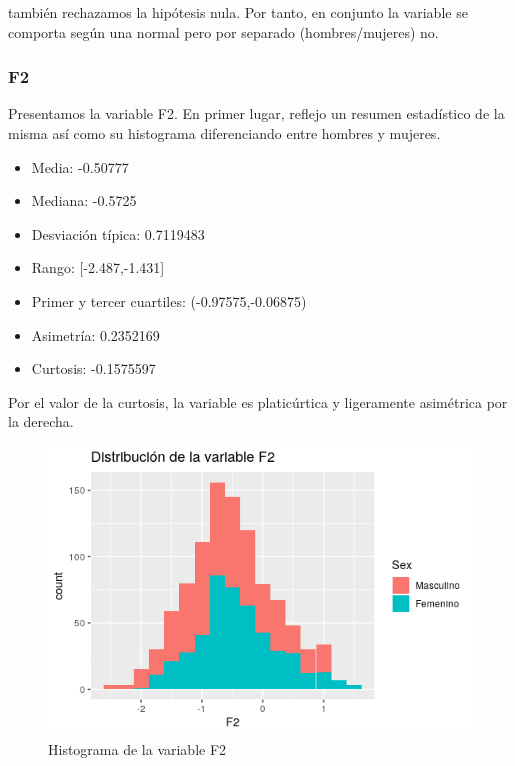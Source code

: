 también rechazamos la hipótesis nula. Por tanto, en conjunto la variable se comporta según una normal pero por separado (hombres/mujeres) no.

\subsubsection{F2}

Presentamos la variable F2. En primer lugar, reflejo un resumen estadístico de la misma así como su histograma diferenciando entre hombres y mujeres.
\begin{itemize}
	\item Media: -0.50777
	\item Mediana: -0.5725
	\item Desviación típica: 0.7119483
	\item Rango: [-2.487,-1.431]
	\item Primer y tercer cuartiles: (-0.97575,-0.06875)
	\item Asimetría: 0.2352169
	\item Curtosis: -0.1575597
\end{itemize}

Por el valor de la curtosis, la variable es platicúrtica y ligeramente asimétrica por la derecha.

\begin{figure}[H] %
	\centering
	\includegraphics[scale=0.6]{dist-F2.png}  %
	\caption{Histograma de la variable F2} 
	\label{fig:hist-F2}
\end{figure}


